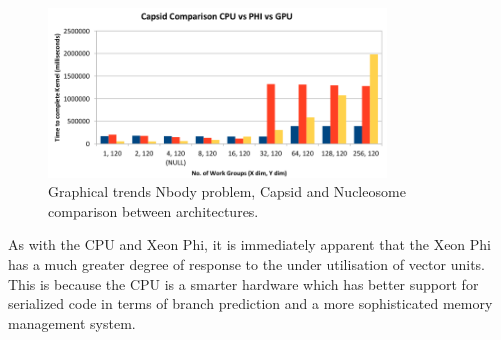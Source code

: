 \begin{figure}[!h]
    \centering
    \includegraphics[width=0.8\textwidth]{figures/nbody_comp.png}
    \caption{Graphical trends Nbody problem, Capsid and Nucleosome 
            comparison between architectures.}
    \label{nbody_comp}
\end{figure}

\par{As with the CPU and Xeon Phi, it is immediately apparent 
    that the Xeon Phi has a much greater degree of response to 
    the under utilisation of vector units. This is because the CPU 
    is a smarter hardware which has better support for serialized 
    code in terms of branch prediction and a more sophisticated memory 
    management system.}


